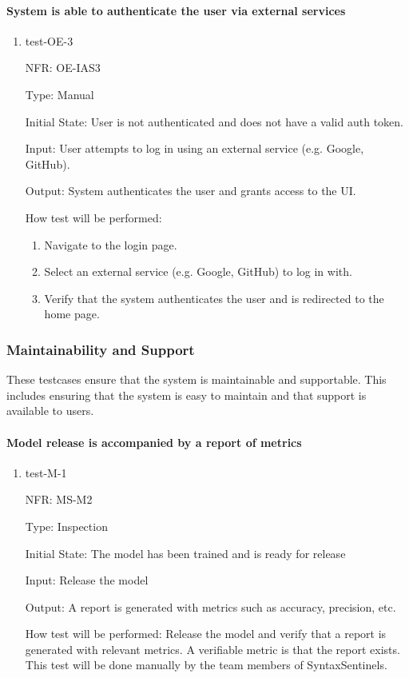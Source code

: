 \documentclass[12pt, titlepage]{article}
\begin{document}
\paragraph{System is able to authenticate the user via external services}
\begin{enumerate}
  \item{test-OE-3}

  NFR: OE-IAS3

  Type: Manual
            
  Initial State: User is not authenticated and does not have a valid auth token.
            
  Input: User attempts to log in using an external service (e.g. Google, GitHub).
            
  Output: System authenticates the user and grants access to the UI.
            
  How test will be performed: 
  \begin{enumerate}
    \item Navigate to the login page.
    \item Select an external service (e.g. Google, GitHub) to log in with.
    \item Verify that the system authenticates the user and is redirected to the home page.
  \end{enumerate}
\end{enumerate}

\subsubsection{Maintainability and Support}
These testcases ensure that the system is maintainable and supportable. This includes ensuring that the system is easy to maintain and that support is available to users.

\paragraph{Model release is accompanied by a report of metrics}

\begin{enumerate}

  \item{test-M-1}

  NFR: MS-M2

  Type: Inspection

  Initial State: The model has been trained and is ready for release

  Input: Release the model

  Output: A report is generated with metrics such as accuracy, precision, etc.

  How test will be performed:
  Release the model and verify that a report is generated with relevant metrics. A verifiable metric is that the report exists.
  This test will be done manually by the team members of SyntaxSentinels.

\end{enumerate}
\end{document}
